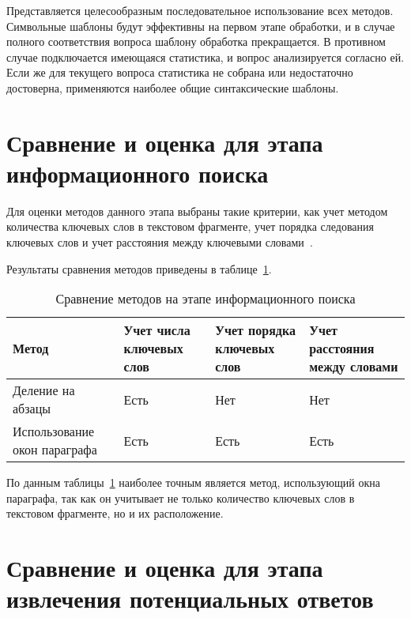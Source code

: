 Представляется целесообразным последовательное использование всех методов. Символьные шаблоны будут эффективны на первом этапе обработки, и в случае полного соответствия вопроса шаблону обработка прекращается. В противном случае подключается имеющаяся статистика, и вопрос анализируется согласно ей. Если же для текущего вопроса статистика не собрана или недостаточно достоверна, применяются наиболее общие синтаксические шаблоны. 

\section{Сравнение и оценка для этапа информационного поиска}

Для оценки методов данного этапа выбраны такие критерии, как учет методом количества ключевых слов в текстовом фрагменте, учет порядка следования ключевых слов и учет расстояния между ключевыми словами~\cite{all}. 

Результаты сравнения методов приведены в таблице~\ref{tb:s2}.

\begin{table}[h!]
	\begin{center}
		\begin{threeparttable}
			\captionsetup{justification=raggedright,singlelinecheck=off}
			\caption{\label{tb:s2} Сравнение методов на этапе информационного поиска}
			\begin{tabular}{|p{4.1cm}|p{2.5cm}|p{2.5cm}|p{3.0cm}|}
				\hline
				Метод & Учет числа ключевых слов & Учет порядка ключевых слов & Учет расстояния между словами\\ [0.8ex] 
				\hline
				Деление на абзацы & Есть & Нет & Нет \\
				\hline
				Использование окон параграфа & Есть & Есть & Есть \\
				\hline
			\end{tabular}
		\end{threeparttable} 
	\end{center}
\end{table}

По данным таблицы~\ref{tb:s2} наиболее точным является метод, использующий окна параграфа, так как он учитывает не только количество ключевых слов в текстовом фрагменте, но и их расположение.



\section{Сравнение и оценка для этапа извлечения потенциальных ответов}

